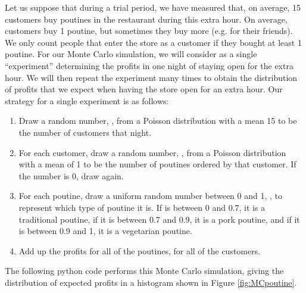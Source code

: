 Let us suppose that during a trial period, we have measured that, on average, 15 customers buy poutines in the restaurant during this extra hour. On average, customers buy 1 poutine, but sometimes they buy more (e.g. for their friends). We only count people that enter the store as a customer if they bought at least 1 poutine. For our Monte Carlo simulation, we will consider as a single ``experiment'' determining the profits in one night of staying open for the extra hour. We will then repeat the experiment many times to obtain the distribution of profits that we expect when having the store open for an extra hour. Our strategy for a single experiment is as follows:
\begin{enumerate}
\item Draw a random number, , from a Poisson distribution with a mean 15 to be the number of customers that night.
\item For each customer, draw a random number, , from a Poisson distribution with a mean of 1 to be the number of poutines ordered by that customer. If the number is 0, draw again. 
\item For each poutine, draw a uniform random number between 0 and 1, , to represent which type of poutine it is. If  is between 0 and 0.7, it is a traditional poutine, if it is between 0.7 and 0.9, it is a pork poutine, and if it is between 0.9 and 1, it is a vegetarian poutine.
\item Add up the profits for all of the poutines, for all of the customers.
\end{enumerate}

The following python code performs this Monte Carlo simulation, giving the distribution of expected profits in a histogram shown in Figure \ref{fig:MCpoutine}.

